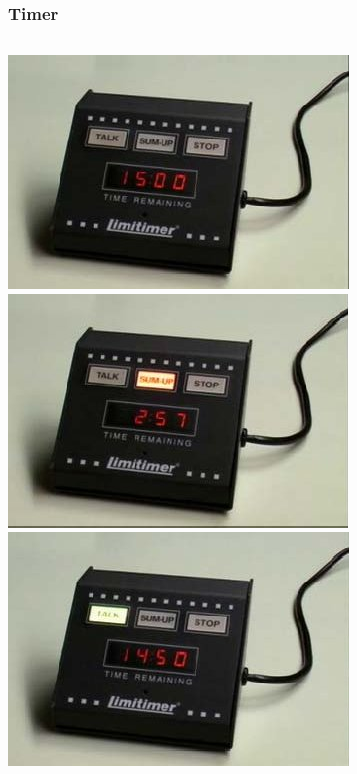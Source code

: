 \documentclass{beamer}
\begin{document}
\begin{frame}
\frametitle{Timer}

\begin{columns}[c]
\includegraphics[width=.9\columnwidth]{before}\\
\includegraphics[width=.9\columnwidth]{wrapup}
\includegraphics[width=.9\columnwidth]{during}\\

\end{columns}
\end{frame}
\end{document}
